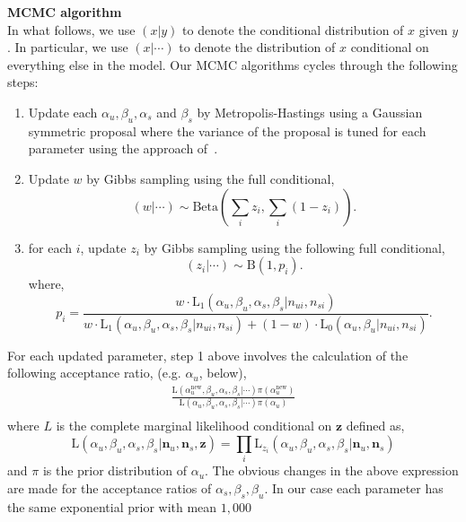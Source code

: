 \documentclass{article}
\begin{document}
\noindent\textbf{MCMC algorithm}\\
In what follows, we use $(x|y)$ to denote the conditional distribution of $x$ given $y$. In particular, we use $(x|\cdots)$ to denote the distribution of $x$ conditional on everything else in the model. Our MCMC algorithms cycles through the following steps: 
\begin{enumerate}
\item Update each $\alpha_u, \beta_u, \alpha_s$ and $\beta_s$ by Metropolis-Hastings using a Gaussian symmetric proposal where the variance of the proposal is tuned for each parameter using the approach of~\cite{Gelman:2004tc,Raftery:1992vp,Raftery:1996ws}.
\item Update $w$ by Gibbs sampling using the full conditional,
\[
(w|\cdots)\sim \mathrm{Beta}(\sum_i z_i,\sum_i (1-z_i)).
\]
\item for each $i$, update $z_i$ by Gibbs sampling using the following full conditional,
\[
(z_i|\cdots)\sim\mathrm{B}(1,p_i).
\]
where,
\[
p_i=\frac{w\cdot\mathrm{L_1}(\alpha_u,\beta_u,\alpha_s,\beta_s| n_{ui},n_{si})}{w\cdot\mathrm{L_1}(\alpha_u,\beta_u,\alpha_s,\beta_s|n_{ui},n_{si})+(1-w)\cdot\mathrm{L_0}(\alpha_u,\beta_u|n_{ui},n_{si})}.
\]
\end{enumerate}
For each updated parameter, step 1 above involves the calculation of the following acceptance ratio, (e.g. $\alpha_u$, below),
\[
\begin{split}
\frac{\mathrm{L}(\alpha^{\text{new}}_u,\beta_u,\alpha_s,\beta_s|\cdots)\pi(\alpha^{\text{new}}_u)}{\mathrm{L}(\alpha_u,\beta_u,\alpha_s,\beta_s|\cdots)\pi(\alpha_u)}\\
\end{split}
\]
where $L$ is the complete marginal likelihood conditional on $\mathbf{z}$ defined as,
\[
\mathrm{L}(\alpha_u,\beta_u,\alpha_s,\beta_s|\mathbf{n}_u,\mathbf{n}_s,\mathbf{z})=\prod_i\mathrm{L}_{z_i}(\alpha_u,\beta_u,\alpha_s,\beta_s|\mathbf{n}_u,\mathbf{n}_s)
\]
and $\pi$ is the prior distribution of $\alpha_u$. The obvious changes in the above expression are made for the acceptance ratios of $\alpha_s,\beta_s,\beta_u$. In our case each parameter has the same exponential prior with mean $1,000$
\end{document}

